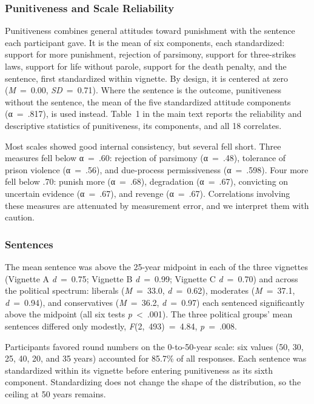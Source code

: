 \subsubsection{Punitiveness and Scale Reliability}\label{punitiveness-and-scale-reliability}

Punitiveness combines general attitudes toward punishment with the sentence each participant gave. It is the mean of six components, each standardized: support for more punishment, rejection of parsimony, support for three-strikes laws, support for life without parole, support for the death penalty, and the sentence, first standardized within vignette. By design, it is centered at zero (\emph{M}~=~0.00, \emph{SD}~=~0.71). Where the sentence is the outcome, punitiveness without the sentence, the mean of the five standardized attitude components (α~=~.817), is used instead. Table~1 in the main text reports the reliability and descriptive statistics of punitiveness, its components, and all 18 correlates.

Most scales showed good internal consistency, but several fell short. Three measures fell below α~=~.60: rejection of parsimony (α~=~.48), tolerance of prison violence (α~=~.56), and due-process permissiveness (α~=~.598). Four more fell below .70: punish more (α~=~.68), degradation (α~=~.67), convicting on uncertain evidence (α~=~.67), and revenge (α~=~.67). Correlations involving these measures are attenuated by measurement error, and we interpret them with caution.

\subsubsection{Sentences}\label{sentences}

The mean sentence was above the 25-year midpoint in each of the three vignettes (Vignette A \emph{d}~=~0.75; Vignette B \emph{d}~=~0.99; Vignette C \emph{d}~=~0.70) and across the political spectrum: liberals (\emph{M}~=~33.0, \emph{d}~=~0.62), moderates (\emph{M}~=~37.1, \emph{d}~=~0.94), and conservatives (\emph{M}~=~36.2, \emph{d}~=~0.97) each sentenced significantly above the midpoint (all six tests \emph{p}~\textless{}~.001). The three political groups' mean sentences differed only modestly, \emph{F}(2,~493)~=~4.84, \emph{p}~=~.008.

Participants favored round numbers on the 0-to-50-year scale: six values (50, 30, 25, 40, 20, and 35 years) accounted for 85.7\% of all responses. Each sentence was standardized within its vignette before entering punitiveness as its sixth component. Standardizing does not change the shape of the distribution, so the ceiling at 50 years remains.

